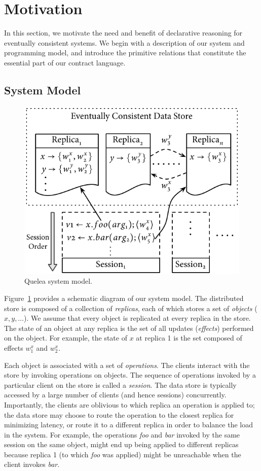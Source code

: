 \section{Motivation}
\label{sec:motivation}

In this section, we motivate the need and benefit of declarative reasoning for
eventually consistent systems.  We begin with a description of our system and
programming model, and introduce the primitive relations that constitute the
essential part of our contract language.

\subsection{System Model}
\label{sec:sysmod}

\begin{figure}
\centering
\includegraphics[width=0.75\columnwidth]{Figures/SystemModel}
\caption{Quelea system model.}
\label{fig:sysmod}
\end{figure}

Figure~\ref{fig:sysmod} provides a schematic diagram of our system model. The
distributed store is composed of a collection of \emph{replicas}, each of which
stores a set of \emph{objects} ($x,y,\ldots$). We assume that every object is
replicated at every replica in the store. The state of an object at any replica
is the set of all updates (\emph{effects}) performed on the object. For
example, the state of $x$ at replica 1 is the set composed of effects $w^x_1$
and $w^x_2$.

Each object is associated with a set of \emph{operations}. The clients interact
with the store by invoking operations on objects. The sequence of operations
invoked by a particular client on the store is called a \emph{session}. The
data store is typically accessed by a large number of clients (and hence
sessions) concurrently. Importantly, the clients are oblivious to which replica
an operation is applied to; the data store may choose to route the operation to
the closest replica for minimizing latency, or route it to a different replica
in order to balance the load in the system. For example, the operations
\emph{foo} and \emph{bar} invoked by the same session on the same object, might
end up being applied to different replicas because replica 1 (to which
\emph{foo} was applied) might be unreachable when the client invokes
\emph{bar}.

